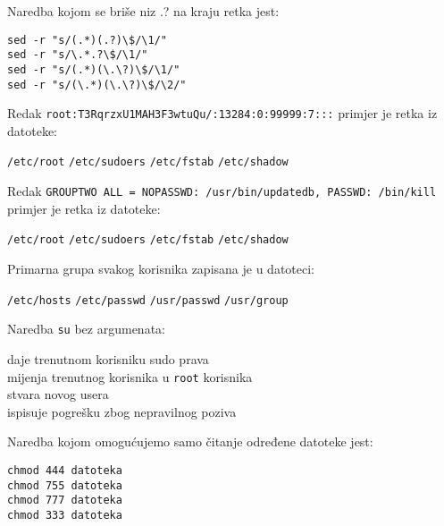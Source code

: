 \documentclass[a4paper,11pt]{exam}
\newcommand{\shell}[1]{\texttt{#1}}
\begin{document}
\begin{questions}
  \question
  Naredba kojom se briše niz .? na kraju retka jest: 

		\begin{oneparchoices}
		\choice \verb|sed -r "s/(.*)(.?)\$/\1/"|  \\
		\choice \verb|sed -r "s/\.*.?\$/\1/"| \\
    \CorrectChoice \verb|sed -r "s/(.*)(\.\?)\$/\1/"| \\ 
    \choice \verb|sed -r "s/(\.*)(\.\?)\$/\2/"|
	\end{oneparchoices}

	
		\question
	Redak \shell{root:T3RqrzxU1MAH3F3wtuQu/:13284:0:99999:7:::} primjer je retka iz datoteke:
	
	\begin{oneparchoices}
		\choice \shell{/etc/root} 
		\choice \shell{/etc/sudoers} 
		\choice \shell{/etc/fstab} 
		\CorrectChoice \shell{/etc/shadow}
  \end{oneparchoices}

		\question
	Redak \shell{GROUPTWO    ALL = NOPASSWD: /usr/bin/updatedb, PASSWD: /bin/kill} primjer je retka iz datoteke:
	
	\begin{oneparchoices}
		\choice \shell{/etc/root} 
		\CorrectChoice \shell{/etc/sudoers} 
		\choice \shell{/etc/fstab} 
		\choice \shell{/etc/shadow}
  \end{oneparchoices}


	\question
	Primarna grupa svakog korisnika zapisana je u datoteci:

	\begin{oneparchoices}
   	\choice \shell{/etc/hosts}
		\CorrectChoice \shell{/etc/passwd}
		\choice \shell{/usr/passwd} 
		\choice \shell{/usr/group}  
	\end{oneparchoices}

	\question
  Naredba \shell{su} bez argumenata:
	
	\begin{oneparchoices}
		\choice daje trenutnom korisniku sudo prava \\
		\CorrectChoice mijenja trenutnog korisnika u \shell{root} korisnika \\ 
		\choice stvara novog usera \\
		\choice ispisuje pogrešku zbog nepravilnog poziva
	\end{oneparchoices}
	
	\question
  Naredba kojom omogućujemo samo čitanje određene datoteke jest: 

	\begin{oneparchoices}
		\CorrectChoice \shell{chmod 444 datoteka}\\ 
		\choice \shell{chmod 755 datoteka} \\
		\choice \shell{chmod 777 datoteka} \\
		\choice \shell{chmod 333 datoteka}
	\end{oneparchoices}
	

\end{questions}
\end{document}
